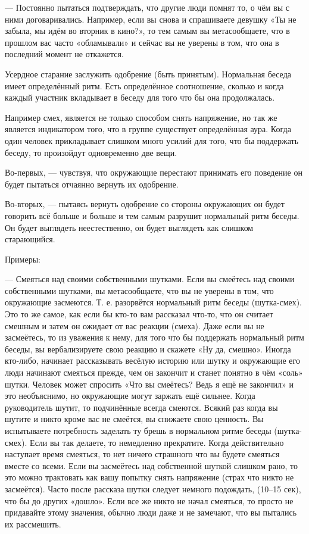 --- Постоянно пытаться подтверждать, что другие люди помнят то, о чём вы с ними договаривались. Например, если вы снова и спрашиваете девушку «Ты не забыла, мы идём во вторник в кино?», то тем самым вы метасообщаете, что в прошлом вас часто «обламывали» и сейчас вы не уверены в том, что она в последний момент не откажется.

Усердное старание заслужить одобрение (быть принятым). Нормальная беседа имеет определённый ритм. Есть определённое соотношение, сколько и когда каждый участник вкладывает в беседу для того что бы она продолжалась.

Например смех, является не только способом снять напряжение, но так же является индикатором того, что в группе существует определённая аура. Когда один человек прикладывает слишком много усилий для того, что бы поддержать беседу, то произойдут одновременно две вещи.

Во-первых, --- чувствуя, что окружающие перестают принимать его поведение он будет пытаться отчаянно вернуть их одобрение.

Во-вторых, --- пытаясь вернуть одобрение со стороны окружающих он будет говорить всё больше и больше и тем самым разрушит нормальный ритм беседы. Он будет выглядеть неестественно, он будет выглядеть как слишком старающийся.

Примеры:

--- Смеяться над своими собственными шутками. Если вы смеётесь над своими собственными шутками, вы метасообщаете, что вы не уверены в том, что окружающие засмеются. Т. е. разорвётся нормальный ритм беседы (шутка-смех). Это то же самое, как если бы кто-то вам рассказал что-то, что он считает смешным и затем он ожидает от вас реакции (смеха). Даже если вы не засмеётесь, то из уважения к нему, для того что бы поддержать нормальный ритм беседы, вы вербализируете свою реакцию и скажете «Ну да, смешно». Иногда кто-либо, начинает рассказывать весёлую историю или шутку и окружающие его люди начинают смеяться прежде, чем он закончит и станет понятно в чём «соль» шутки. Человек может спросить «Что вы смеётесь? Ведь я ещё не закончил» и это необъяснимо, но окружающие могут заржать ещё сильнее. Когда руководитель шутит, то подчинённые всегда смеются. Всякий раз когда вы шутите и никто кроме вас не смеётся, вы снижаете свою ценность. Вы испытываете потребность заделать ту брешь в нормальном ритме беседы (шутка-смех). Если вы так делаете, то немедленно прекратите. Когда действительно наступает время смеяться, то нет ничего страшного что вы будете смеяться вместе со всеми. Если вы засмеётесь над собственной шуткой слишком рано, то это можно трактовать как вашу попытку снять напряжение (страх что никто не засмеётся). Часто после рассказа шутки следует немного подождать, (10–15 сек), что бы до других «дошло». Если все же никто не начал смеяться, то просто не придавайте этому значения, обычно люди даже и не замечают, что вы пытались их рассмешить.


